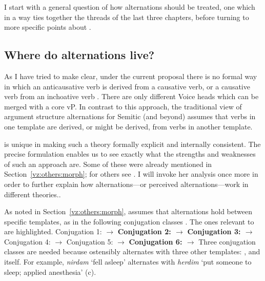 I start with a general question of how alternations should be treated, one which in a way ties together the threads of the last three chapters, before turning to more specific points about {\thif}.
	
	\subsection{Where do alternations live?} \label{vd:others:arad}
As I have tried to make clear, under the current proposal there is no formal way in which an anticausative verb is derived from a causative verb, or a causative verb from an inchoative verb \citep{schaefer08}. There are only different Voice heads which can be merged with a core vP. In contrast to this approach, the traditional view of argument structure alternations for Semitic (and beyond) assumes that verbs in one template are derived, or might be derived, from verbs in another template.

\cite{arad05} is unique in making such a theory formally explicit and internally consistent. The precise formulation enables us to see exactly what the strengths and weaknesses of such an approach are. Some of these were already mentioned in Section~\ref{vz:others:morph}; for others see \cite{kastnertucker19cup}. I will invoke her analysis once more in order to further explain how alternations---or perceived alternations---work in different theories..

As noted in Section~\ref{vz:others:morph}, \cite{arad05} assumes that alternations hold between specific templates, as in the following conjugation classes \cite[226]{arad05}. The ones relevant to {\thif} are highlighted.
\pex
	\a Conjugation 1: {\tnif} $\rightarrow$ {\tkal}
	\a \textbf{Conjugation 2: {\tkal} $\rightarrow$ {\thif}}
	\a \textbf{Conjugation 3: {\tnif} $\rightarrow$ {\thif}}
	\a Conjugation 4: {\thit} $\rightarrow$ {\tpie}
	\a Conjugation 5: {\thit} $\rightarrow$ {\tpie}
	\a \textbf{Conjugation 6: {\thif} $\rightarrow$ {\thif}}
\xe
Three conjugation classes are needed because {\thif} ostensibly alternates with three other templates: {\tkal}, {\tnif} and {\thif} itself. For example, \emph{nirdam} `fell asleep' alternates with \emph{herdim} `put someone to sleep; applied anesthesia' (\lastx c).

